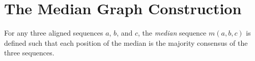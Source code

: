 


\section{The Median Graph Construction}
\label{sec:median_complex}
%
\begin{defn}
  \label{defn:median}
  For any three aligned sequences $a$, $b$, and $c$, the \emph{median} sequence $m(a,b,c)$ is defined such that each position of the median is the majority consensus of the three sequences.
\end{defn}

